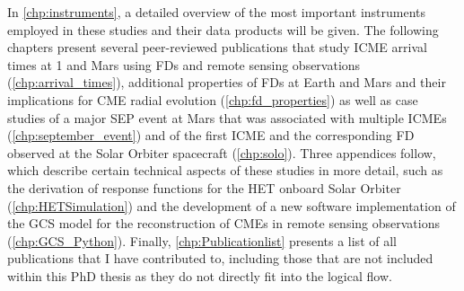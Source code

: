In \autoref{chp:instruments}, a detailed overview of the most important instruments employed in these studies and their data products will be given. The following chapters present several peer-reviewed publications that study \ac{ICME} arrival times at \SI{1}{\AU} and Mars using \acp{FD} and remote sensing observations (\autoref{chp:arrival_times}), additional properties of \acp{FD} at Earth and Mars and their implications for \ac{CME} radial evolution (\autoref{chp:fd_properties}) as well as case studies of a major \ac{SEP} event at Mars that was associated with multiple \acp{ICME} (\autoref{chp:september_event}) and of the first \ac{ICME} and the corresponding \ac{FD} observed at the Solar Orbiter spacecraft (\autoref{chp:solo}). Three appendices follow, which describe certain technical aspects of these studies in more detail, such as the derivation of response functions for the \ac{HET} onboard Solar Orbiter (\autoref{chp:HETSimulation}) and the development of a new software implementation of the \ac{GCS} model for the reconstruction of \acp{CME} in remote sensing observations (\autoref{chp:GCS_Python}). Finally, \autoref{chp:Publicationlist} presents a list of all publications that I have contributed to, including those that are not included within this PhD thesis as they do not directly fit into the logical flow.
